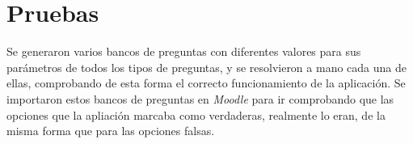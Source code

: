 \section{Pruebas}
Se generaron varios bancos de preguntas con diferentes valores para sus parámetros de todos los tipos de preguntas, y se resolvieron a mano cada una de ellas, comprobando de esta forma el correcto funcionamiento de la aplicación. Se importaron estos bancos de preguntas en \textit{Moodle} para ir comprobando que las opciones que la apliación marcaba como verdaderas, realmente lo eran, de la misma forma que para las opciones falsas.

